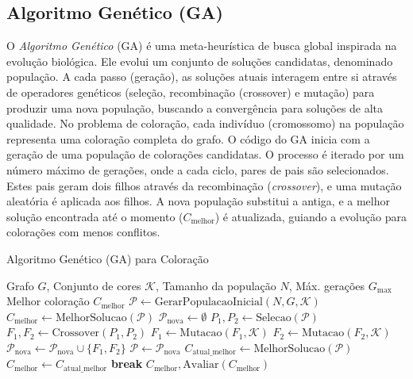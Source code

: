 \documentclass[12pt,a4paper]{article}
\begin{document}
\subsection{Algoritmo Genético (GA)}
O \textit{Algoritmo Genético} (GA) é uma meta-heurística de busca global inspirada na evolução biológica. Ele evolui um conjunto de soluções candidatas, denominado população. A cada passo (geração), as soluções atuais interagem entre si através de operadores genéticos (seleção, recombinação (crossover) e mutação) para produzir uma nova população, buscando a convergência para soluções de alta qualidade. No problema de coloração, cada indivíduo (cromossomo) na população representa uma coloração completa do grafo.
O código do GA inicia com a geração de uma população de colorações candidatas. O processo é iterado por um número máximo de gerações, onde a cada ciclo, pares de pais são selecionados. Estes pais geram dois filhos através da recombinação (\textit{crossover}), e uma mutação aleatória é aplicada aos filhos. A nova população substitui a antiga, e a melhor solução encontrada até o momento ($C_{\text{melhor}}$) é atualizada, guiando a evolução para colorações com menos conflitos.
\begin{algorithm}[H]
\caption{Algoritmo Genético (GA) para Coloração}
\label{alg:genetic_algorithm}
\begin{algorithmic}[1]
\Require Grafo \(G\), Conjunto de cores \(\mathcal{K}\), Tamanho da população \(N\), Máx. gerações \(G_{\max}\)
\Ensure Melhor coloração \(C_{\text{melhor}}\)
\State \(\mathcal{P} \gets \text{GerarPopulacaoInicial}(N, G, \mathcal{K})\)
\State \(C_{\text{melhor}} \gets \text{MelhorSolucao}(\mathcal{P})\)
    \State \(\mathcal{P}_{\text{nova}} \gets \emptyset\)
        \State \(P_1, P_2 \gets \text{Selecao}(\mathcal{P})\) 
        \State \(F_1, F_2 \gets \text{Crossover}(P_1, P_2)\)
        \State \(F_1 \gets \text{Mutacao}(F_1, \mathcal{K})\)
        \State \(F_2 \gets \text{Mutacao}(F_2, \mathcal{K})\)
        \State \(\mathcal{P}_{\text{nova}} \gets \mathcal{P}_{\text{nova}} \cup \{F_1, F_2\}\)
    \EndFor
    \State \(\mathcal{P} \gets \mathcal{P}_{\text{nova}}\)
    \State \(C_{\text{atual\_melhor}} \gets \text{MelhorSolucao}(\mathcal{P})\)
        \State \(C_{\text{melhor}} \gets C_{\text{atual\_melhor}}\)
    \EndIf
     \State \textbf{break} \EndIf
\EndFor
\State \Return \(C_{\text{melhor}}, \text{Avaliar}(C_{\text{melhor}})\)
\end{algorithmic}
\end{algorithm}
\end{document}
